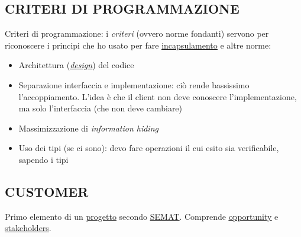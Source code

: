 		\subsection{CRITERI DI PROGRAMMAZIONE}		\label{criteriprog}
		Criteri di programmazione: %
		i \textit{criteri} (ovvero norme fondanti) servono per riconoscere i principi che ho usato per fare \underline{\hyperref[incapsulamento]{incapsulamento}} e altre norme:
		\begin{itemize}
			\item Architettura (\textit{\underline{\hyperref[progettazione]{design}}}) del codice
			\item Separazione interfaccia e implementazione: ciò rende bassissimo l'accoppiamento. L'idea è che il client non deve conoscere l'implementazione, ma solo l'interfaccia (che non deve cambiare)
			\item Massimizzazione di \textit{information hiding}
			\item Uso dei tipi (se ci sono): devo fare operazioni il cui esito sia verificabile, sapendo i tipi
		\end{itemize}


		\subsection{CUSTOMER}  \label{customer}
		Primo elemento di un \underline{\hyperref[progetto]{progetto}} secondo \underline{\hyperref[semat]{SEMAT}}. Comprende \underline{\hyperref[opportunity]{opportunity}} e \underline{\hyperref[stakeholder]{stakeholders}}.
